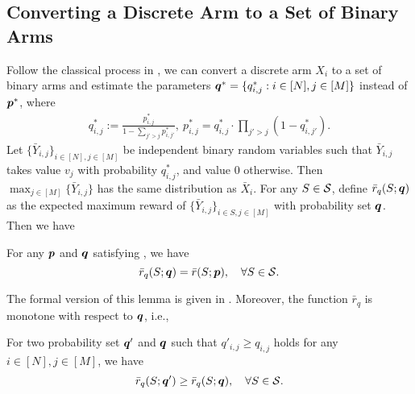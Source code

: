 \subsection{Converting a Discrete Arm to a Set of Binary Arms}
\label{sec:discrete-binary}
Follow the classical process in \citet{wang2023combinatorial}, we can convert a discrete arm $X_i$ to a set of binary arms and estimate the parameters ${\bm{q}}^* = \{q^*_{i,j} : i \in [N], j \in [M]\}$ instead of ${\bm{p}}^*$, where
\begin{align}\label{eq:qstar-def}
    q_{i,j}^* := \frac{p_{i,j}^*}{1 - \sum_{j' > j} p_{i,j'}^*}, \ p^*_{i,j} = q^*_{i,j} \cdot \prod_{j' > j} (1 - q^*_{i,j'}).
\end{align}
Let $\{\bar Y_{i,j}\}_{i \in [N],j \in [M]}$ be independent binary random variables such that $\bar Y_{i,j}$ takes value $v_j$ with probability $q_{i,j}^*$, and value $0$ otherwise. Then $\max_{j \in [M]}\{\bar Y_{i,j}\}$ has the same distribution as $\bar X_{i}$.
For any $S \in {\mathcal{S}}$, define $\bar r_q(S; {\bm{q}})$ as the expected maximum reward of $\{\bar Y_{i,j}\}_{i \in S, j \in [M]}$ with probability set ${\bm{q}}$. 
Then we have 
\begin{lemma}\label{lemma:r-q-r}
    For any ${\bm{p}}$ and ${\bm{q}}$ satisfying , we have $$\bar r_q(S; {\bm{q}}) = \bar r(S; {\bm{p}}), \quad \forall S \in {\mathcal{S}}.$$
\end{lemma}
The formal version of this lemma is given in . 
Moreover, the function $\bar r_q$ is monotone with respect to  ${\bm{q}}$, i.e., 
\begin{lemma}
\label{lemma:monotone}
    For two probability set ${\bm{q}}'$ and ${\bm{q}}$ such that $q'_{i,j} \ge q_{i,j}$ holds for any $i \in [N], j \in [M]$, we have 
    $$\bar r_q(S; {\bm{q}}') \ge \bar r_q(S;{\bm{q}}),\quad  \forall S \in {\mathcal{S}}.$$
\end{lemma}



